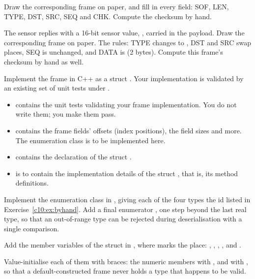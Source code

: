  Draw the corresponding  frame on paper, and fill in every field: SOF, LEN,
TYPE, DST, SRC, SEQ and CHK. Compute the checksum by hand.

 The sensor replies with a 16-bit sensor value, , carried in the payload. Draw
the corresponding  frame on paper. The rules: TYPE changes to , DST
and SRC swap places, SEQ is unchanged, and DATA is  (2 bytes). Compute this frame's
checksum by hand as well.

\label{c10:ex:cpp}
Implement the frame in C++ as a struct . Your implementation is validated by an
existing set of unit tests under .

\begin{itemize}
  \item {} contains the unit tests validating your frame implementation. You
    do not write them; you make them pass.
  \item {} contains the frame fields' offsets (index positions), the field
    sizes and more. The enumeration class  is to be implemented here.
  \item {} contains the declaration of the struct .
  \item {} is to contain the implementation details of the struct
    , that is, its method definitions.
\end{itemize}

Implement the enumeration class  in , giving each of the
four types the id listed in Exercise~\ref{c10:ex:byhand}. Add a final enumerator , one
step beyond the last real type, so that an out-of-range type can be rejected during deserialisation
with a single comparison.

Add the member variables of the struct  in , where
 marks the place: , ,
, ,  and .

Value-initialise each of them with braces: the numeric members with \code{\{\}}, and  with
, so that a default-constructed frame never holds a type that happens to
be valid.

